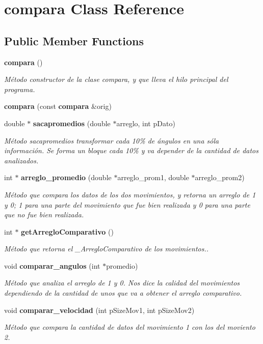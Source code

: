 \section{compara Class Reference}
\label{classcompara}
\subsection*{Public Member Functions}
\begin{DoxyCompactItemize}
\item 
{\bf compara} ()
\begin{DoxyCompactList}\small\item\em Método constructor de la clase compara, y que lleva el hilo principal del programa. \end{DoxyCompactList}\item 
{\bfseries compara} (const {\bf compara} \&orig)\label{classcompara_a5fba67ea99f0cdc005cb9292fba53a04}

\item 
double $\ast$ {\bf sacapromedios} (double $\ast$arreglo, int p\-Dato)
\begin{DoxyCompactList}\small\item\em Método sacapromedios transformar cada 10\% de ángulos en una sóla información. Se forma un bloque cada 10\% y va depender de la cantidad de datos analizados. \end{DoxyCompactList}\item 
int $\ast$ {\bf arreglo\-\_\-promedio} (double $\ast$arreglo\-\_\-prom1, double $\ast$arreglo\-\_\-prom2)
\begin{DoxyCompactList}\small\item\em Método que compara los datos de los dos movimientos, y retorna un arreglo de 1 y 0; 1 para una parte del movimiento que fue bien realizada y 0 para una parte que no fue bien realizada. \end{DoxyCompactList}\item 
int $\ast$ {\bf get\-Arreglo\-Comparativo} ()
\begin{DoxyCompactList}\small\item\em Método que retorna el \-\_\-\-Arreglo\-Comparativo de los movimientos.. \end{DoxyCompactList}\item 
void {\bf comparar\-\_\-angulos} (int $\ast$promedio)
\begin{DoxyCompactList}\small\item\em Método que analiza el arreglo de 1 y 0. Nos dice la calidad del movimientos dependiendo de la cantidad de unos que va a obtener el arreglo comparativo. \end{DoxyCompactList}\item 
void {\bf comparar\-\_\-velocidad} (int p\-Size\-Mov1, int p\-Size\-Mov2)
\begin{DoxyCompactList}\small\item\em Método que compara la cantidad de datos del movimiento 1 con los del moviento 2. \end{DoxyCompactList}\end{DoxyCompactItemize}


